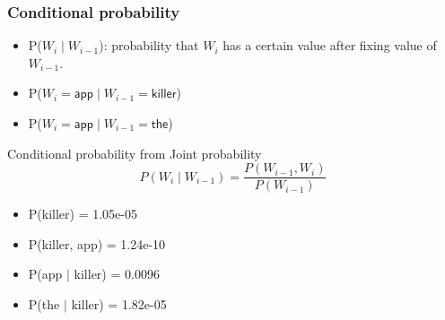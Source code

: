 \begin{frame}
\frametitle{Conditional probability}
\begin{itemize}[<+->]
\item P($W_{i} \mid W_{i-1}$): probability that $W_{i}$ has a certain value after fixing value of $W_{i-1}$.
\item P($W_{i} = \textsf{app} \mid W_{i-1} = \textsf{killer}$)
\item P($W_{i} = \textsf{app} \mid W_{i-1} = \textsf{the}$)
\end{itemize}
\pause
\begin{block}{Conditional probability from Joint probability}
\[ P(W_{i} \mid W_{i-1}) = \frac{P(W_{i-1}, W_i)}{P(W_{i-1})} \]
\begin{itemize}
\item P(killer) = 1.05e-05
\item P(killer, app) = 1.24e-10
\item P(app $\mid$ killer) = 0.0096
\item P(the $\mid$ killer) = 1.82e-05
\end{itemize}

\end{block}
\end{frame}

